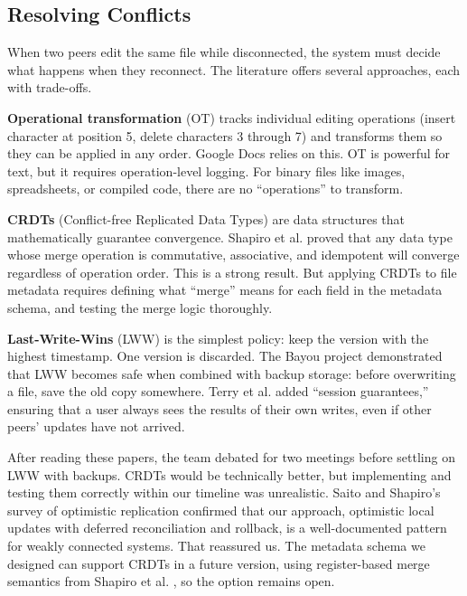 \subsection{Resolving Conflicts}

When two peers edit the same file while disconnected, the system must decide what happens when they reconnect. The literature offers several approaches, each with trade-offs.

\textbf{Operational transformation} (OT) \cite{sun1998} tracks individual editing operations (insert character at position 5, delete characters 3 through 7) and transforms them so they can be applied in any order. Google Docs relies on this. OT is powerful for text, but it requires operation-level logging. For binary files like images, spreadsheets, or compiled code, there are no ``operations'' to transform.

\textbf{CRDTs} (Conflict-free Replicated Data Types) \cite{shapiro2011} are data structures that mathematically guarantee convergence. Shapiro et al. proved that any data type whose merge operation is commutative, associative, and idempotent will converge regardless of operation order. This is a strong result. But applying CRDTs to file metadata requires defining what ``merge'' means for each field in the metadata schema, and testing the merge logic thoroughly.

\textbf{Last-Write-Wins} (LWW) is the simplest policy: keep the version with the highest timestamp. One version is discarded. The Bayou project \cite{bayou1995} demonstrated that LWW becomes safe when combined with backup storage: before overwriting a file, save the old copy somewhere. Terry et al. \citeyear{terry1994} added ``session guarantees,'' ensuring that a user always sees the results of their own writes, even if other peers' updates have not arrived.

After reading these papers, the team debated for two meetings before settling on LWW with backups. CRDTs would be technically better, but implementing and testing them correctly within our timeline was unrealistic. Saito and Shapiro's \citeyear{saito2005} survey of optimistic replication confirmed that our approach, optimistic local updates with deferred reconciliation and rollback, is a well-documented pattern for weakly connected systems. That reassured us. The metadata schema we designed can support CRDTs in a future version, using register-based merge semantics from Shapiro et al. \citeyear{shapiro2011}, so the option remains open.

